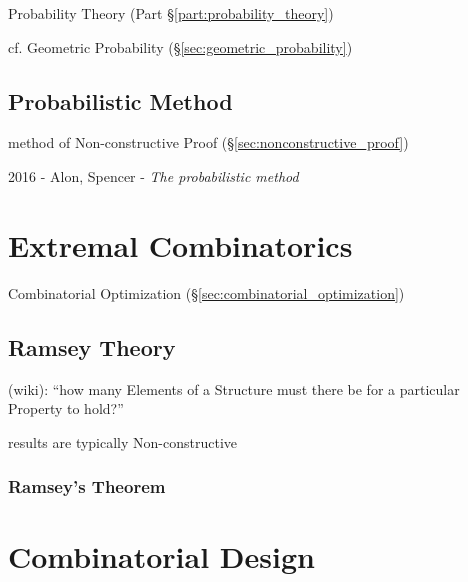 Probability Theory (Part \S\ref{part:probability_theory})

cf. Geometric Probability (\S\ref{sec:geometric_probability})



\subsection{Probabilistic Method}\label{sec:probabilistic_method}

method of Non-constructive Proof (\S\ref{sec:nonconstructive_proof})

2016 - Alon, Spencer - \emph{The probabilistic method}



\section{Extremal Combinatorics}\label{sec:extremal_combinatorics}

Combinatorial Optimization (\S\ref{sec:combinatorial_optimization})



\subsection{Ramsey Theory}\label{sec:ramsey_theory}

(wiki): ``how many Elements of a Structure must there be for a particular
Property to hold?''

results are typically Non-constructive



\subsubsection{Ramsey's Theorem}\label{sec:ramseys_theorem}



\section{Combinatorial Design}\label{sec:combinatorial_design}

